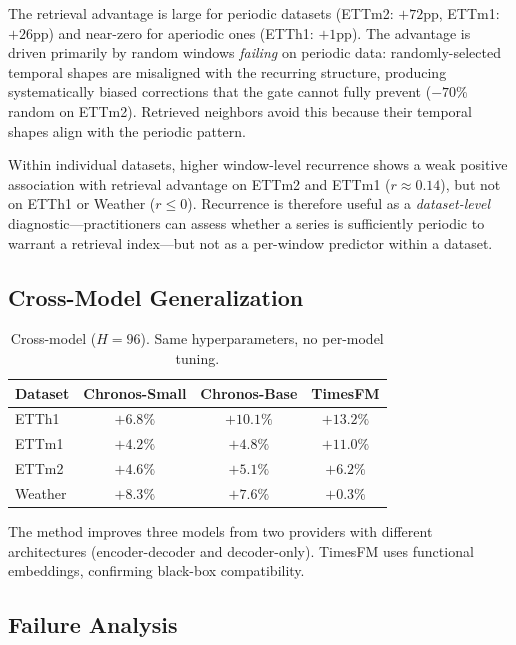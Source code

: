 \documentclass{article}
\begin{document}
The retrieval advantage is large for periodic datasets (ETTm2: $+72$pp, ETTm1: $+26$pp) and near-zero for aperiodic ones (ETTh1: $+1$pp). The advantage is driven primarily by random windows \emph{failing} on periodic data: randomly-selected temporal shapes are misaligned with the recurring structure, producing systematically biased corrections that the gate cannot fully prevent ($-70\%$ random on ETTm2). Retrieved neighbors avoid this because their temporal shapes align with the periodic pattern.

Within individual datasets, higher window-level recurrence shows a weak positive association with retrieval advantage on ETTm2 and ETTm1 ($r {\approx} 0.14$), but not on ETTh1 or Weather ($r {\leq} 0$). Recurrence is therefore useful as a \emph{dataset-level} diagnostic---practitioners can assess whether a series is sufficiently periodic to warrant a retrieval index---but not as a per-window predictor within a dataset.

\subsection{Cross-Model Generalization}

\begin{table}[h]
\centering
\caption{Cross-model ($H{=}96$). Same hyperparameters, no per-model tuning.}
\label{tab:cross}
\small
\begin{tabular}{l c c c}
\toprule
Dataset & Chronos-Small & Chronos-Base & TimesFM \\
\midrule
ETTh1 & $+6.8\%$ & $+10.1\%$ & $+13.2\%$ \\
ETTm1 & $+4.2\%$ & $+4.8\%$ & $+11.0\%$ \\
ETTm2 & $+4.6\%$ & $+5.1\%$ & $+6.2\%$ \\
Weather & $+8.3\%$ & $+7.6\%$ & $+0.3\%$ \\
\bottomrule
\end{tabular}
\end{table}

The method improves three models from two providers with different architectures (encoder-decoder and decoder-only). TimesFM uses functional embeddings, confirming black-box compatibility.

\subsection{Failure Analysis}
\label{sec:failure}
\end{document}
